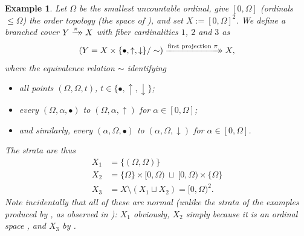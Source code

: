 \documentclass[11pt,leqno]{article}
\theoremstyle{plain}
\theoremstyle{plain}
\theoremstyle{plain}
\newtheorem{example}[lemma]{Example}
\numberwithin{equation}{section}
\theoremstyle{nonumberplain}
\newcommand\1{{\bf 1}}
\newcommand{\xrightarrowdbl}[2][]{%
  \xrightarrow[#1]{#2}\mathrel{\mkern-14mu}\rightarrow
}
\begin{document}
\begin{example}\label{ex:prod.2.uncount.ord}
  Let $\Omega$ be the smallest uncountable ordinal, give $[0,\Omega]$ (ordinals $\le \Omega$) the order topology (the space of \cite[Example 4.3]{ss_countertop}), and set $X:=[0,\Omega]^2$. We define a branched cover $Y\xrightarrowdbl{\pi}X$ with fiber cardinalities $1$, $2$ and $3$ as
  \begin{equation*}
    \left(Y=X\times\{\bullet,\uparrow,\downarrow\}/\sim\right)
    \xrightarrowdbl[]{\text{first projection }\pi}
    X,
  \end{equation*}
  where the equivalence relation $\sim$ identifying
  \begin{itemize}
  \item all points $(\Omega,\Omega,t)$, $t\in \{\bullet,\uparrow,\downarrow\}$;
  \item every $(\Omega,\alpha,\bullet)$ to $(\Omega,\alpha,\uparrow)$ for $\alpha\in [0,\Omega]$;
  \item and similarly, every $(\alpha,\Omega,\bullet)$ to $(\alpha,\Omega,\downarrow)$ for $\alpha\in [0,\Omega]$.
  \end{itemize}
  The strata are thus 
  \begin{equation*}
    \begin{aligned}
      X_1 &= \{(\Omega,\Omega)\}\\
      X_2 &=
            \{\Omega\}\times [0,\Omega)
            \ \sqcup\ 
            [0,\Omega)\times \{\Omega\}\\
      X_3 &= X\setminus \left(X_1\sqcup X_2\right)
            =[0,\Omega)^2.
    \end{aligned}    
  \end{equation*}
  Note incidentally that all of these are normal (unlike the strata of the examples produced by , as observed in ): $X_1$ obviously, $X_2$ simply because it is an ordinal space \cite[Example 39 6.]{ss_countertop}, and $X_3$ by \cite[Corollary 3.3, (c') $\Leftrightarrow$ (f')]{zbMATH00090161}.
  

\end{example}
\end{document}
